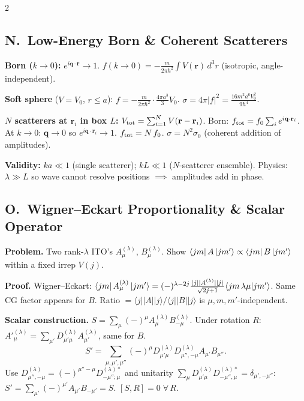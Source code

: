\documentclass[9pt,a4paper]{article} %
\begin{document}
\begin{multicols}{2}
\subsection{N.\ Low-Energy Born \& Coherent Scatterers}
\textbf{Born ($k\to 0$):} $e^{i\mathbf{q}\cdot\mathbf{r}}\to 1$.\;
$f(k\to 0)=-\frac{m}{2\pi\hbar^2}\int V(\mathbf{r})\,d^3r$ (isotropic, angle-independent).

\textbf{Soft sphere} ($V=V_0$, $r\le a$): 
$f=-\frac{m}{2\pi\hbar^2}\cdot\frac{4\pi a^3}{3}V_0$.\;
$\sigma=4\pi|f|^2=\frac{16m^2 a^6 V_0^2}{9\hbar^4}$.

\textbf{$N$ scatterers at $\mathbf{r}_i$ in box $L$:}
$V_{\rm tot}=\sum_{i=1}^N V(\mathbf{r}-\mathbf{r}_i)$.\;
Born: $f_{\rm tot}=f_0\sum_i e^{i\mathbf{q}\cdot\mathbf{r}_i}$.
At $k\to 0$: $\mathbf{q}\to 0$ so $e^{i\mathbf{q}\cdot\mathbf{r}_i}\to 1$.\;
$f_{\rm tot}=N\,f_0$.\;
$\boxed{\sigma=N^2\sigma_0}$ (coherent addition of amplitudes).

\textbf{Validity:} $ka\ll 1$ (single scatterer); $kL\ll 1$ ($N$-scatterer ensemble).
Physics: $\lambda\gg L$ so wave cannot resolve positions $\implies$ amplitudes add in phase.

\subsection{O.\ Wigner--Eckart Proportionality \& Scalar Operator}
\textbf{Problem.} Two rank-$\lambda$ ITO's $A^{(\lambda)}_\mu$, $B^{(\lambda)}_\mu$. Show $\bra{jm}A\ket{jm'}\propto\bra{jm}B\ket{jm'}$ within a fixed irrep $V(j)$.

\textbf{Proof.} Wigner--Eckart:
$\bra{jm}A^{(\lambda)}_\mu\ket{jm'}=(-)^{\lambda-2j}\frac{\langle j||A^{(\lambda)}||j\rangle}{\sqrt{2j+1}}\langle jm\,\lambda\mu|jm'\rangle$.
Same CG factor appears for $B$. Ratio $=\langle j||A||j\rangle/\langle j||B||j\rangle$ is $\mu,m,m'$-independent. \checkmark

\textbf{Scalar construction.} $S=\sum_\mu (-)^\mu A^{(\lambda)}_\mu B^{(\lambda)}_{-\mu}$.
Under rotation $R$: $A'^{(\lambda)}_\mu=\sum_{\mu'}D^{(\lambda)}_{\mu'\mu}A^{(\lambda)}_{\mu'}$, same for $B$.
\[
S'=\sum_{\mu,\mu',\mu''}(-)^\mu D^{(\lambda)}_{\mu'\mu}D^{(\lambda)}_{\mu''\!,-\mu}A_{\mu'}B_{\mu''}.
\]
Use $D^{(\lambda)}_{\mu'',-\mu}=(-)^{\mu''-\mu}D^{(\lambda)*}_{-\mu'';\mu}$ and unitarity $\sum_\mu D^{(\lambda)}_{\mu'\mu}D^{(\lambda)*}_{-\mu'',\mu}=\delta_{\mu',-\mu''}$:
$S'=\sum_{\mu'}(-)^{\mu'} A_{\mu'}B_{-\mu'}=S$.\; $\boxed{[S,R]=0\;\forall\,R}$.\; \checkmark


\end{multicols}
\end{document}
